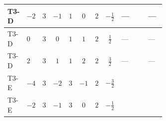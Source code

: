 \documentclass[8pt]{article}
\begin{document}
\begin{landscape}
\begin{longtable}{@{}llcccccc >{\raggedright\arraybackslash}p{0.21\linewidth} >{\raggedright\arraybackslash}p{0.21\linewidth} >{\raggedright\arraybackslash}p{0.21\linewidth}@{}}
\midrule
T3-D & $-2$ & $3$ & $-1$ & $1$ & $0$ & $2$ & $-\frac{1}{2}$ & --- & \scriptsize\adjustbox{max width=\linewidth}{$\begin{gathered} -8 \operatorname{Tr}\!\left({M_F}\,\left({y_2}\right)^{\dagger}\,{y_2}\,\left({M_F}\right)^{\dagger}\right)\end{gathered}$} & --- \\
\midrule
T3-D & $0$ & $3$ & $0$ & $1$ & $1$ & $2$ & $\frac{1}{2}$ & --- & \scriptsize\adjustbox{max width=\linewidth}{$\begin{gathered} -8 \operatorname{Tr}\!\left({M_F}\,\left({y_2}\right)^{\dagger}\,{y_2}\,\left({M_F}\right)^{\dagger}\right)\end{gathered}$} & --- \\
\midrule
T3-D & $2$ & $3$ & $1$ & $1$ & $2$ & $2$ & $\frac{3}{2}$ & --- & \scriptsize\adjustbox{max width=\linewidth}{$\begin{gathered} -8 \operatorname{Tr}\!\left({M_F}\,\left({y_2}\right)^{\dagger}\,{y_2}\,\left({M_F}\right)^{\dagger}\right)\end{gathered}$} & --- \\
\midrule
T3-E & $-4$ & $3$ & $-2$ & $3$ & $-1$ & $2$ & $-\frac{3}{2}$ & \scriptsize\adjustbox{max width=\linewidth}{$\begin{gathered} {m_2^2} (2 T_{\nu}^{(2)}+8 {\lambda_{S_2}^{(1)}}+4 {\lambda_{S_2}^{(A)}})\end{gathered}$} & \scriptsize\adjustbox{max width=\linewidth}{$\begin{gathered} -4 \operatorname{Tr}\!\left({M_F}\,\left({y_2}\right)^{\dagger}\,{y_2}\,\left({M_F}\right)^{\dagger}\right)\end{gathered}$} & \scriptsize\adjustbox{max width=\linewidth}{$\begin{gathered} -12 {g_2}^2 {m_2^2}\end{gathered}$} \\
\midrule
T3-E & $-2$ & $3$ & $-1$ & $3$ & $0$ & $2$ & $-\frac{1}{2}$ & \scriptsize\adjustbox{max width=\linewidth}{$\begin{gathered} {m_2^2} (2 T_{\nu}^{(2)}+8 {\lambda_{S_2}^{(1)}}+4 {\lambda_{S_2}^{(A)}})\end{gathered}$} & \scriptsize\adjustbox{max width=\linewidth}{$\begin{gathered} -4 \operatorname{Tr}\!\left({M_F}\,\left({y_2}\right)^{\dagger}\,{y_2}\,\left({M_F}\right)^{\dagger}\right)\end{gathered}$} & \scriptsize\adjustbox{max width=\linewidth}{$\begin{gathered} -12 {g_2}^2 {m_2^2}\end{gathered}$} \\

\end{longtable}
\end{landscape}
\end{document}
